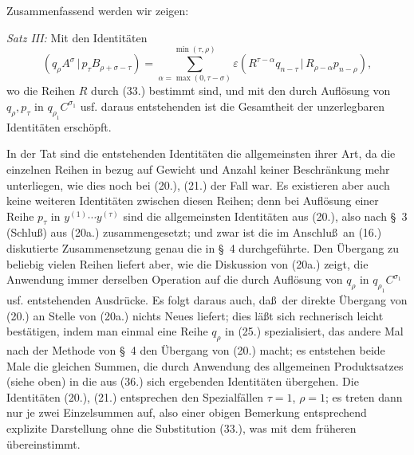 \documentclass[11pt]{article}
\providecommand{\pair}[2]{(#1\,|\,#2)}
\providecommand{\eps}{\varepsilon}
\begin{document}
Zusammenfassend werden wir zeigen:

\emph{Satz III:} Mit den Identit\"aten
\begin{equation}
 \pair{q_\rho A^\sigma}{p_\tau B_{\rho+\sigma-\tau}}
 =\sum_{\alpha=\max(0,\tau-\sigma)}^{\min(\tau,\rho)}
 \eps\pair{R^{\tau-\alpha}q_{n-\tau}}{R_{\rho-\alpha}p_{n-\rho}},
\tag{36}
\end{equation}
wo die Reihen $R$ durch (33.) bestimmt sind, und mit den durch Aufl\"osung von $q_\rho,p_\tau$ in $q_{\rho_1}C^{\sigma_1}$ usf. daraus entstehenden ist die Gesamtheit der unzerlegbaren Identit\"aten ersch\"opft.

In der Tat sind die entstehenden Identit\"aten die allgemeinsten ihrer Art, da die einzelnen Reihen in bezug auf Gewicht und Anzahl keiner Beschr\"ankung mehr unterliegen, wie dies noch bei (20.), (21.) der Fall war. Es existieren aber auch keine weiteren Identit\"aten zwischen diesen Reihen; denn bei Aufl\"osung einer Reihe $p_\tau$ in $y^{(1)}\cdots y^{(\tau)}$ sind die allgemeinsten Identit\"aten aus (20.), also nach \S\ 3 (Schlu\ss) aus (20a.) zusammengesetzt; und zwar ist die im Anschlu\ss\ an (16.) diskutierte Zusammensetzung genau die in \S\ 4 durchgef\"uhrte. Den \"Ubergang zu beliebig vielen Reihen liefert aber, wie die Diskussion von (20a.) zeigt, die Anwendung immer derselben Operation auf die durch Aufl\"osung von $q_\rho$ in $q_{\rho_1}C^{\sigma_1}$ usf. entstehenden Ausdr\"ucke. Es folgt daraus auch, da\ss\ der direkte \"Ubergang von (20.) an Stelle von (20a.) nichts Neues liefert; dies l\"a\ss t sich rechnerisch leicht best\"atigen, indem man einmal eine Reihe $q_\rho$ in (25.) spezialisiert, das andere Mal nach der Methode von \S\ 4 den \"Ubergang von (20.) macht; es entstehen beide Male die gleichen Summen, die durch Anwendung des allgemeinen Produktsatzes (siehe oben) in die aus (36.) sich ergebenden Identit\"aten \"ubergehen. Die Identit\"aten (20.), (21.) entsprechen den Spezialf\"allen $\tau=1$, $\rho=1$; es treten dann nur je zwei Einzelsummen auf, also einer obigen Bemerkung entsprechend explizite Darstellung ohne die Substitution (33.), was mit dem fr\"uheren \"ubereinstimmt.
\end{document}
